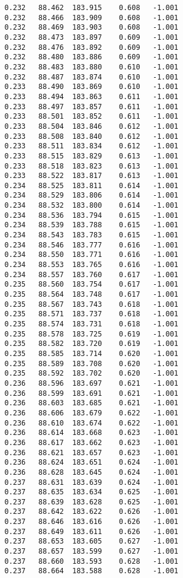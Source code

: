 \begin{verbatim}
   0.232   88.462  183.915    0.608   -1.001
   0.232   88.466  183.909    0.608   -1.001
   0.232   88.469  183.903    0.608   -1.001
   0.232   88.473  183.897    0.609   -1.001
   0.232   88.476  183.892    0.609   -1.001
   0.232   88.480  183.886    0.609   -1.001
   0.232   88.483  183.880    0.610   -1.001
   0.232   88.487  183.874    0.610   -1.001
   0.233   88.490  183.869    0.610   -1.001
   0.233   88.494  183.863    0.611   -1.001
   0.233   88.497  183.857    0.611   -1.001
   0.233   88.501  183.852    0.611   -1.001
   0.233   88.504  183.846    0.612   -1.001
   0.233   88.508  183.840    0.612   -1.001
   0.233   88.511  183.834    0.612   -1.001
   0.233   88.515  183.829    0.613   -1.001
   0.233   88.518  183.823    0.613   -1.001
   0.233   88.522  183.817    0.613   -1.001
   0.234   88.525  183.811    0.614   -1.001
   0.234   88.529  183.806    0.614   -1.001
   0.234   88.532  183.800    0.614   -1.001
   0.234   88.536  183.794    0.615   -1.001
   0.234   88.539  183.788    0.615   -1.001
   0.234   88.543  183.783    0.615   -1.001
   0.234   88.546  183.777    0.616   -1.001
   0.234   88.550  183.771    0.616   -1.001
   0.234   88.553  183.765    0.616   -1.001
   0.234   88.557  183.760    0.617   -1.001
   0.235   88.560  183.754    0.617   -1.001
   0.235   88.564  183.748    0.617   -1.001
   0.235   88.567  183.743    0.618   -1.001
   0.235   88.571  183.737    0.618   -1.001
   0.235   88.574  183.731    0.618   -1.001
   0.235   88.578  183.725    0.619   -1.001
   0.235   88.582  183.720    0.619   -1.001
   0.235   88.585  183.714    0.620   -1.001
   0.235   88.589  183.708    0.620   -1.001
   0.235   88.592  183.702    0.620   -1.001
   0.236   88.596  183.697    0.621   -1.001
   0.236   88.599  183.691    0.621   -1.001
   0.236   88.603  183.685    0.621   -1.001
   0.236   88.606  183.679    0.622   -1.001
   0.236   88.610  183.674    0.622   -1.001
   0.236   88.614  183.668    0.623   -1.001
   0.236   88.617  183.662    0.623   -1.001
   0.236   88.621  183.657    0.623   -1.001
   0.236   88.624  183.651    0.624   -1.001
   0.236   88.628  183.645    0.624   -1.001
   0.237   88.631  183.639    0.624   -1.001
   0.237   88.635  183.634    0.625   -1.001
   0.237   88.639  183.628    0.625   -1.001
   0.237   88.642  183.622    0.626   -1.001
   0.237   88.646  183.616    0.626   -1.001
   0.237   88.649  183.611    0.626   -1.001
   0.237   88.653  183.605    0.627   -1.001
   0.237   88.657  183.599    0.627   -1.001
   0.237   88.660  183.593    0.628   -1.001
   0.237   88.664  183.588    0.628   -1.001

\end{verbatim}
